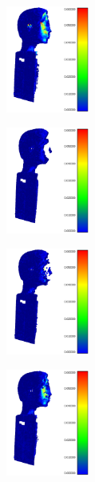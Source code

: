 \begin{figure}[H]
	\centering
	\begin{subfigure}[b]{0.19\textwidth}
		\centering
		\includegraphics[height=3.5cm]{figures/hausdorff_ref.png}
		\caption{}
		\label{fig:best:a}
	\end{subfigure}
	\hfill
	\begin{subfigure}[b]{0.19\textwidth}
		\centering
		\includegraphics[height=3.5cm]{figures/soridealfilt.png}
		\caption{}
		\label{fig:best:b}
	\end{subfigure}
	\hfill
	\begin{subfigure}[b]{0.19\textwidth}
		\centering
		\includegraphics[height=3.5cm]{figures/ror_best.png}
		\caption{}
		\label{fig:best:c}
	\end{subfigure}
	\hfill
	\begin{subfigure}[b]{0.19\textwidth}
		\centering
		\includegraphics[height=3.5cm]{figures/pcn_best.png}
		\caption{}
		\label{fig:best:d}
	\end{subfigure}
	\hfill
	\begin{subfigure}[b]{0.19\textwidth}

\end{subfigure}
\end{figure}
